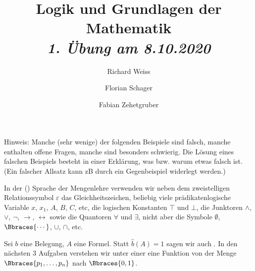 \documentclass{article}
\title
{
  Logik und Grundlagen der Mathematik \\
  \vspace{4pt}
  \normalsize
  \textit{1. Übung am 8.10.2020}
}
\author
{
  Richard Weiss
  \and
  Florian Schager
  \and
  Fabian Zehetgruber
}
\date{}
\begin{document}
\maketitle

Hinweis:
Manche (sehr wenige) der folgenden Beispiele sind falsch, manche enthalten offene Fragen, manche sind besonders schwierig.
Die Lösung eines falschen Beispiels besteht in einer Erklärung, was bzw. warum etwas falsch ist.
(Ein falscher Allsatz kann zB durch ein Gegenbeispiel widerlegt werden.)




\phantom{}

In der () Sprache der Mengenlehre verwenden wir neben dem zweistelligen Relationssymbol $\varepsilon$ das Gleichheitszeichen, beliebig viele prädikatenlogische Variable $x$, $x_1$, $A$, $B$, $C$, etc, die logischen Konstanten $\top$ und $\bot$, die Junktoren $\land$, $\lor$, $\neg$, $\to$, $\leftrightarrow$ sowie die Quantoren $\forall$ und $\exists$, nicht aber die Symbole $\emptyset$, $\Bbraces{\cdots}$, $\cup$, $\cap$, etc.







\phantom{}

Sei $b$ eine Belegung, $A$ eine Formel.
Statt $\hat{b}(A) = 1$ sagen wir auch .
In den nächsten 3 Aufgaben verstehen wir unter einer  eine Funktion von der Menge $\Bbraces{p_1, \ldots, p_n}$ nach $\Bbraces{0, 1}$.



\end{document}
